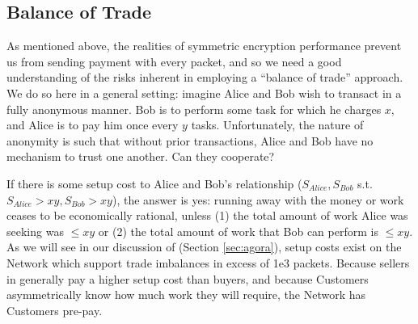\subsection{Balance of Trade}
\label{tokens-bot}

As mentioned above, the realities of symmetric encryption performance prevent us from sending payment with every packet, and so we need a good understanding of the risks inherent in employing a ``balance of trade'' approach. We do so here in a general setting: imagine Alice and Bob wish to transact in a fully anonymous manner. Bob is to perform some task for which he charges $x$, and Alice is to pay him once every $y$ tasks. Unfortunately, the nature of anonymity is such that without prior transactions, Alice and Bob have no mechanism to trust one another. Can they cooperate?

If there is some setup cost to Alice and Bob's relationship ($S_{Alice}, S_{Bob}$ s.t. $S_{Alice} > xy, S_{Bob} > xy$), the answer is yes: running away with the money or work ceases to be economically rational, unless (1) the total amount of work Alice was seeking was $\leq xy$ or (2) the total amount of work that Bob can perform is $\leq xy$. As we will see in our discussion of \tOM{} (Section \ref{sec:agora}), setup costs exist on the \Orchid{} Network which support trade imbalances in excess of 1e3 packets. Because sellers in \tOM{} generally pay a higher setup cost than buyers, and because Customers asymmetrically know how much work they will require, the \Orchid{} Network has Customers pre-pay.





